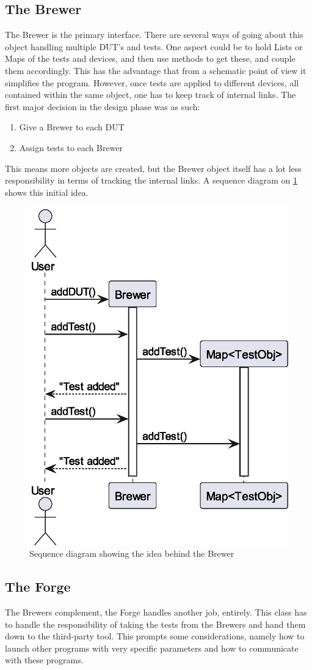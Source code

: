 \subsection{The Brewer}
The Brewer is the primary interface. There are several ways of going about this object handling multiple DUT's and tests. One aspect could be to hold Lists or Maps of the tests and devices, and then use methods to get these, and couple them accordingly. This has the advantage that from a schematic point of view it simplifies the program. However, once tests are applied to different devices, all contained within the same object, one has to keep track of internal links. The first major decision in the design phase was as such:
\begin{enumerate}
    \item Give a Brewer to each DUT
    \item Assign tests to each Brewer
\end{enumerate}
This means more objects are created, but the Brewer object itself has a lot less responsibility in terms of tracking the internal links.\newline
A sequence diagram on \cref{fig:seqBrew} shows this initial idea.
\begin{figure}
    \centering
    \caption{Sequence diagram showing the idea behind the Brewer}\label{fig:seqBrew}
    \includegraphics[width=.5\textwidth]{out/plantuml/Brewer/brewer.eps}
\end{figure}
\subsection{The Forge}
The Brewers complement, the Forge handles another job, entirely. This class has to handle the responsibility of taking the tests from the Brewers and hand them down to the third-party tool. This prompts some considerations, namely how to launch other programs with very specific parameters and how to communicate with these programs.

